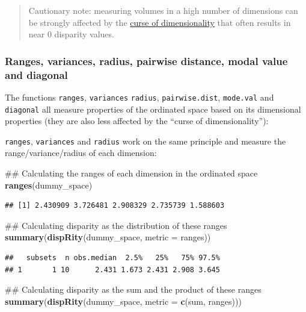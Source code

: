 \documentclass[]{book}
\newenvironment{Shaded}{\begin{snugshade}}{\end{snugshade}}
\newcommand{\KeywordTok}[1]{\textcolor[rgb]{0.13,0.29,0.53}{\textbf{#1}}}
\newcommand{\DataTypeTok}[1]{\textcolor[rgb]{0.13,0.29,0.53}{#1}}
\newcommand{\NormalTok}[1]{#1}
\theoremstyle{definition}
\theoremstyle{definition}
\theoremstyle{remark}
\begin{document}
\begin{quote}
Cautionary note: measuring volumes in a high number of dimensions can be
strongly affected by the
\href{https://en.wikipedia.org/wiki/Curse_of_dimensionality}{curse of
dimensionality} that often results in near 0 disparity values.
\end{quote}

\subsubsection{Ranges, variances, radius, pairwise distance, modal value
and
diagonal}\label{ranges-variances-radius-pairwise-distance-modal-value-and-diagonal}

The functions \texttt{ranges}, \texttt{variances} \texttt{radius},
\texttt{pairwise.dist}, \texttt{mode.val} and \texttt{diagonal} all
measure properties of the ordinated space based on its dimensional
properties (they are also less affected by the ``curse of
dimensionality''):

\texttt{ranges}, \texttt{variances} and \texttt{radius} work on the same
principle and measure the range/variance/radius of each dimension:

\begin{Shaded}
\begin{Highlighting}[]
\NormalTok{## Calculating the ranges of each dimension in the ordinated space}
\KeywordTok{ranges}\NormalTok{(dummy_space)}
\end{Highlighting}
\end{Shaded}

\begin{verbatim}
## [1] 2.430909 3.726481 2.908329 2.735739 1.588603
\end{verbatim}

\begin{Shaded}
\begin{Highlighting}[]
\NormalTok{## Calculating disparity as the distribution of these ranges}
\KeywordTok{summary}\NormalTok{(}\KeywordTok{dispRity}\NormalTok{(dummy_space, }\DataTypeTok{metric =}\NormalTok{ ranges))}
\end{Highlighting}
\end{Shaded}

\begin{verbatim}
##   subsets  n obs.median  2.5%   25%   75% 97.5%
## 1       1 10      2.431 1.673 2.431 2.908 3.645
\end{verbatim}

\begin{Shaded}
\begin{Highlighting}[]
\NormalTok{## Calculating disparity as the sum and the product of these ranges}
\KeywordTok{summary}\NormalTok{(}\KeywordTok{dispRity}\NormalTok{(dummy_space, }\DataTypeTok{metric =} \KeywordTok{c}\NormalTok{(sum, ranges)))}
\end{Highlighting}
\end{Shaded}
\end{document}
